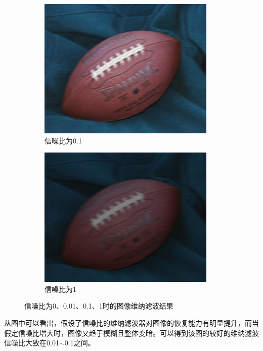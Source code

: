 \documentclass[a4paper]{ctexart}
\newcommand{\outwfour}{0.23\textwidth}
\begin{document}
\begin{spacing}{1.35}
\begin{figure}[htbp]
		\begin{subfigure}[t]{\outwfour}
			\centering
			\includegraphics[width=\textwidth]{figure/deconvwnr3.png}
			\caption{信噪比为0.1}
		\end{subfigure}
		\begin{subfigure}[t]{\outwfour}
			\centering
			\includegraphics[width=\textwidth]{figure/deconvwnr4.png}
			\caption{信噪比为1}
		\end{subfigure}
		\caption{信噪比为0、0.01、0.1、1时的图像维纳滤波结果}
		\label{fig:4wnr}
	\end{figure}
	从图中可以看出，假设了信噪比的维纳滤波器对图像的恢复能力有明显提升，而当假定信噪比增大时，图像又趋于模糊且整体变暗。可以得到该图的较好的维纳滤波信噪比大致在0.01$\sim$0.1之间。


\end{spacing}
\end{document}
